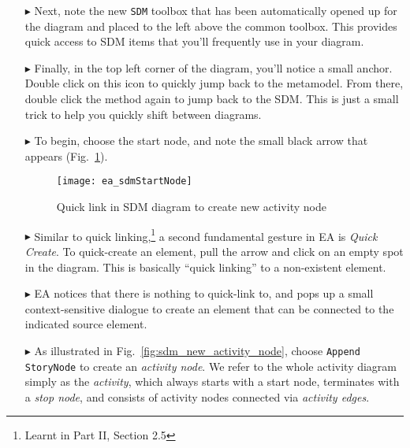 \begin{itemize}
\vspace{0.5cm}

\item[$\blacktriangleright$] Next, note the new \texttt{SDM} toolbox that has been automatically opened up for the diagram and placed to the left above
the common toolbox. This provides quick access to SDM items that you'll frequently use in your diagram.

\vspace{0.5cm}

\item[$\blacktriangleright$] Finally, in the top left corner of the diagram, you'll notice a small anchor. Double click on this icon to quickly jump back to the
metamodel. From there, double click the method again to jump back to the SDM. This is just a small trick to help you quickly shift between diagrams.

\vspace{0.5cm}

\item[$\blacktriangleright$] To begin, choose the start node, and note the small black arrow that appears (Fig.~\ref{fig:sdm_quicklink}). 

\newpage

\begin{figure}[htp]
\begin{center}
  \texttt{[image: ea\_sdmStartNode]}
  \caption{Quick link in SDM diagram to create new activity node}  
  \label{fig:sdm_quicklink}
\end{center}
\end{figure}

\item[$\blacktriangleright$] Similar to quick linking,\footnote{Learnt in Part II, Section 2.5} a second fundamental gesture in EA is \emph{Quick
Create}.
To quick-create an element, pull the arrow and click on an empty spot in the diagram. This is basically ``quick linking'' to a non-existent element.

\item[$\blacktriangleright$] EA notices that there is nothing to quick-link to, and pops up a small context-sensitive dialogue to create an element that can be
connected to the indicated source element.

\item[$\blacktriangleright$] As illustrated in Fig.~\ref{fig:sdm_new_activity_node}, choose \texttt{Append StoryNode} to create an \emph{activity
node}. We refer to the whole activity diagram simply as the \emph{activity}, which always starts with a start node, terminates with a \emph{stop node}, and
consists of activity nodes connected via \emph{activity edges}.


\end{itemize}
